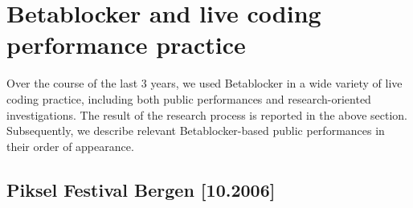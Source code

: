 \documentclass[letterpaper, 12pt]{article}
\begin{document}
%
%
%
%
%
%
%
%
%
%
%
%
%
\parskip 18pt

\section{Betablocker and live coding performance practice}
\label{sec:betablocker_and_livecoding_practice_a_report}

Over the course of the last 3 years, we used Betablocker in a wide variety of live coding practice, including both public performances and research-oriented investigations.
The result of the research process is reported in the above section.
Subsequently, we describe relevant Betablocker-based public performances in their order of appearance.

\subsection{Piksel Festival Bergen [10.2006]}
\label{sub:piksel}
\end{document}

